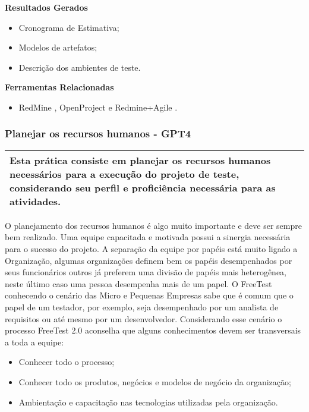 \textbf{Resultados Gerados}
\begin{itemize}
    \item Cronograma de Estimativa;
    \item Modelos de artefatos;
    \item Descrição dos ambientes de teste.
\end{itemize}

\textbf{Ferramentas Relacionadas}
\begin{itemize}
    \item RedMine \cite{Redmine}, OpenProject \cite{OpenProject} e Redmine+Agile \cite{RedmineUP}.
\end{itemize}

\subsubsection{Planejar os recursos humanos - GPT4}
\label{sec:gpt4}

\begin{table}[H]
\centering
\begin{tabular}{|p{130mm}|}
\hline
Esta prática consiste em planejar os recursos humanos necessários para a execução do projeto de teste, considerando seu perfil e proficiência necessária para as atividades. \\ 
\hline
\end{tabular}
\end{table}

O planejamento dos recursos humanos é algo muito importante e deve ser sempre bem realizado. Uma equipe capacitada e motivada possui a sinergia necessária para o sucesso do projeto. A separação da equipe por papéis está muito ligado a Organização, algumas organizações definem bem os papéis desempenhados por seus funcionários outros já preferem uma divisão de papéis mais heterogênea, neste último caso uma pessoa desempenha mais de um papel. O FreeTest conhecendo o cenário das Micro e Pequenas Empresas sabe que é comum que o papel de um testador, por exemplo, seja desempenhado por um analista de requisitos ou até mesmo por um desenvolvedor. Considerando esse cenário o processo FreeTest 2.0 aconselha que alguns conhecimentos devem ser transversais a toda a equipe:

\begin{itemize}
    \item Conhecer todo o processo;
    \item Conhecer todo os produtos, negócios e modelos de negócio da organização;
    \item Ambientação e capacitação nas tecnologias utilizadas pela organização.
\end{itemize}

